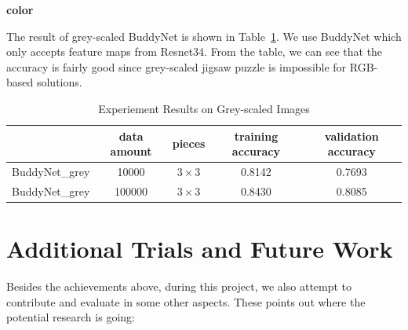 \documentclass{article}
\begin{document}
\textbf{color}

The result of grey-scaled BuddyNet is shown in Table~\ref{tab:expgrey}. We use BuddyNet which only accepts feature maps from Resnet34. From the table, we can see that the accuracy is fairly good since grey-scaled jigsaw puzzle is impossible for RGB-based solutions.

\begin{table}
    \caption{Experiement Results on Grey-scaled Images}
    \centering
    \label{tab:expgrey}
    \begin{tabular}{c|c|c|c|c}
        \hline
        & data amount & pieces & training accuracy & validation accuracy\\
        \hline
        BuddyNet\_grey & 10000 & $3\times 3$ & 0.8142 & 0.7693\\
        \hline
        BuddyNet\_grey & 100000 & $3\times 3$ & 0.8430 & 0.8085\\
        \hline
    \end{tabular}
\end{table}

\section{Additional Trials and Future Work}

Besides the achievements above, during this project, we also attempt to contribute and evaluate in some other aspects. These points out where the potential research is going:
\end{document}
